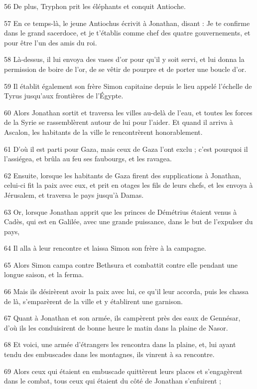 \par 56 De plus, Tryphon prit les éléphants et conquit Antioche.
\par 57 En ce temps-là, le jeune Antiochus écrivit à Jonathan, disant : Je te confirme dans le grand sacerdoce, et je t'établis comme chef des quatre gouvernements, et pour être l'un des amis du roi.
\par 58 Là-dessus, il lui envoya des vases d'or pour qu'il y soit servi, et lui donna la permission de boire de l'or, de se vêtir de pourpre et de porter une boucle d'or.
\par 59 Il établit également son frère Simon capitaine depuis le lieu appelé l'échelle de Tyrus jusqu'aux frontières de l'Égypte.
\par 60 Alors Jonathan sortit et traversa les villes au-delà de l'eau, et toutes les forces de la Syrie se rassemblèrent autour de lui pour l'aider. Et quand il arriva à Ascalon, les habitants de la ville le rencontrèrent honorablement.
\par 61 D'où il est parti pour Gaza, mais ceux de Gaza l'ont exclu ; c'est pourquoi il l'assiégea, et brûla au feu ses faubourgs, et les ravagea.
\par 62 Ensuite, lorsque les habitants de Gaza firent des supplications à Jonathan, celui-ci fit la paix avec eux, et prit en otages les fils de leurs chefs, et les envoya à Jérusalem, et traversa le pays jusqu'à Damas.
\par 63 Or, lorsque Jonathan apprit que les princes de Démétrius étaient venus à Cadès, qui est en Galilée, avec une grande puissance, dans le but de l'expulser du pays,
\par 64 Il alla à leur rencontre et laissa Simon son frère à la campagne.
\par 65 Alors Simon campa contre Bethsura et combattit contre elle pendant une longue saison, et la ferma.
\par 66 Mais ils désirèrent avoir la paix avec lui, ce qu'il leur accorda, puis les chassa de là, s'emparèrent de la ville et y établirent une garnison.
\par 67 Quant à Jonathan et son armée, ils campèrent près des eaux de Gennésar, d'où ils les conduisirent de bonne heure le matin dans la plaine de Nasor.
\par 68 Et voici, une armée d'étrangers les rencontra dans la plaine, et, lui ayant tendu des embuscades dans les montagnes, ils vinrent à sa rencontre.
\par 69 Alors ceux qui étaient en embuscade quittèrent leurs places et s'engagèrent dans le combat, tous ceux qui étaient du côté de Jonathan s'enfuirent ;
